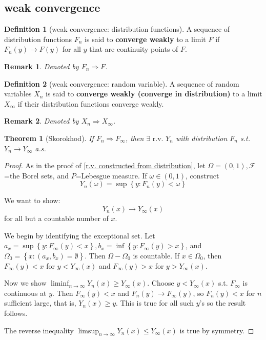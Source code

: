 \documentclass{article}
\newtheorem{Thm}{Theorem}[section]
\newtheorem*{Rk}{Remark}
\theoremstyle{definition}
\newtheorem{Def}{Definition}[section]
\begin{document}
\subsection{weak convergence}
\begin{Def}[weak convergence: distribution functions]
A sequence of distribution functions $F_n$ is said to \textbf{converge weakly} to a limit $F$ if $F_n(y)\to F(y)$ for all $y$ that are continuity points of $F$. 
\end{Def}
\begin{Rk}
Denoted by $F_n\Longrightarrow F$.
\end{Rk}
\begin{Def}[weak convergence: random variable]
A sequence of random variables $X_n$ is said to \textbf{converge weakly (converge in distribution)} to a limit $X_\infty$ if their distribution functions converge weakly.
\end{Def}
\begin{Rk}
Denoted by $X_n\Longrightarrow X_\infty$.
\end{Rk}
\begin{Thm}[Skorokhod]\label{Skorokhod}
If $F_n\Longrightarrow F_\infty$, then $\exists \text{ r.v. } Y_n$ with distribution $F_n$ s.t. $Y_n\longrightarrow Y_\infty$ a.s.
\end{Thm}
\begin{proof}
As in the proof of \ref{r.v. constructed from distribution}, let $\Omega=(0,1),\mathcal{F}$=the Borel sets, and $P$=Lebesgue measure. If $\omega\in(0,1)$, construct \[Y_n(\omega)=\sup\left \{ y:F_n(y)<\omega \right \} \]
\par We want to show: \[Y_n(x)\longrightarrow Y_\infty(x)\] for all but a countable number of $x$.
\par We begin by identifying the exceptional set. Let $a_x=\sup\left \{ y:F_\infty(y)<x \right \}, b_x=\inf\left \{ y:F_\infty(y)>x \right \}$, and $\Omega_0=\left \{ x:(a_x,b_x)=\emptyset \right \}$. Then $\Omega-\Omega_0$ is countable. If $x\in \Omega_0$, then $F_\infty(y)<x$ for $y<Y_\infty(x)$ and $F_\infty(y)>x$ for $y> Y_\infty(x)$.\par
Now we show $\liminf_{n\to\infty} Y_n(x)\ge Y_\infty(x)$. Choose $y<Y_\infty(x)$ s.t. $F_\infty$ is continuous at $y$.  Then  $F_\infty(y)<x$ and $F_n(y)\longrightarrow F_\infty(y)$, so $F_n(y)< x$ for $n$ sufficient large, that is, $Y_n(x)\ge y$. This is true for all such $y$'s so the result follows.\par
The reverse inequality $\limsup_{n\to\infty} Y_n(x)\le Y_\infty(x)$ is true by symmetry.
\end{proof}
\end{document}
